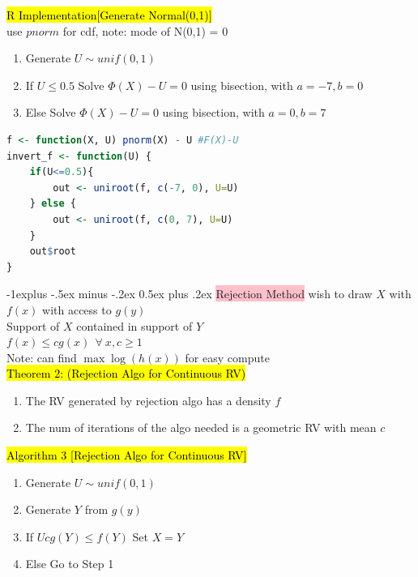 \documentclass[a4paper,12pt,landscape]{article}
\makeatletter
\renewcommand{\subsection}{\@startsection{subsection}{2}{0mm}%
                                {-1explus -.5ex minus -.2ex}%
                                {0.5ex plus .2ex}%
                                {\normalfont\normalsize\bfseries\color{blue}}}
\makeatother
\begin{document}
\begin{multicols}{3}
    \hl{R Implementation[Generate Normal(0,1)]}\\
    use $pnorm$ for cdf, note: mode of N(0,1) = 0
    \begin{enumerate}
        \item Generate $U\sim unif(0,1)$
        \item If $U\leq 0.5$
            \subitem Solve $\Phi(X)-U=0$ using bisection, with $a=-7, b=0$
        \item Else
            \subitem Solve $\Phi(X)-U=0$ using bisection, with $a=0, b=7$
    \end{enumerate}
    \begin{lstlisting}[language=R]
f <- function(X, U) pnorm(X) - U #F(X)-U
invert_f <- function(U) {
    if(U<=0.5){
        out <- uniroot(f, c(-7, 0), U=U)
    } else {
        out <- uniroot(f, c(0, 7), U=U)
    }
    out$root
}
    \end{lstlisting}

    \subsection{\colorbox{pink}{Rejection Method}}
    wish to draw $X$ with $f(x)$ with access to $g(y)$\\
    Support of $X$ contained in support of $Y$\\
    $f(x) \leq cg(x)~~\forall~x, c\geq 1$\\
    Note: can find $\max\log(h(x))$ for easy compute\\

    \hl{Theorem 2: (Rejection Algo for Continuous RV)}\\
    \begin{enumerate}
        \item The RV generated by rejection algo has a density $f$
        \item The num of iterations of the algo needed is a geometric RV with mean $c$
    \end{enumerate}

    \hl{Algorithm 3 [Rejection Algo for Continuous RV]}\\
    \begin{enumerate}
        \item Generate $U\sim unif(0, 1)$
        \item Generate $Y$ from $g(y)$
        \item If $Ucg(Y) \leq f(Y)$
                \subitem Set $X=Y$
        \item Else
            \subitem Go to Step 1
    \end{enumerate}


\end{multicols}
\end{document}
